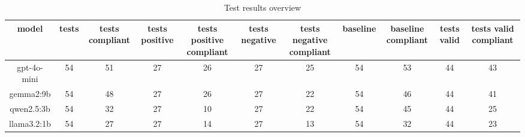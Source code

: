 
  \begin{table}[h!]
  \centering
  \begin{tabular}{|c|c|c|c|c|c|c|c|c|c|c|}
  \hline
  model & tests & tests compliant & tests positive & tests positive compliant & tests negative & tests negative compliant & baseline & baseline compliant & tests valid & tests valid compliant \\
  \hline
  gpt-4o-mini & 54 & 51 & 27 & 26 & 27 & 25 & 54 & 53 & 44 & 43\\
\hline
gemma2:9b & 54 & 48 & 27 & 26 & 27 & 22 & 54 & 46 & 44 & 41\\
\hline
qwen2.5:3b & 54 & 32 & 27 & 10 & 27 & 22 & 54 & 45 & 44 & 25\\
\hline
llama3.2:1b & 54 & 27 & 27 & 14 & 27 & 13 & 54 & 32 & 44 & 23
  \end{tabular}
  \caption{Test results overview}
  
  \end{table}
  